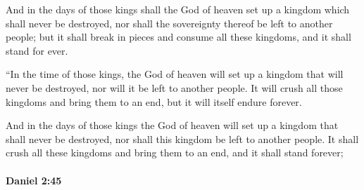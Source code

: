 			\begin{versebox}
					\item[BHS] 
					\item[LXX] 
					\item[ASV] And in the days of those kings shall the God of heaven set up a kingdom which shall never be destroyed, nor shall the sovereignty thereof be left to another people; but it shall break in pieces and consume all these kingdoms, and it shall stand for ever.
					\item[NIV] “In the time of those kings, the God of heaven will set up a kingdom that will never be destroyed, nor will it be left to another people. It will crush all those kingdoms and bring them to an end, but it will itself endure forever.
					\item[NRSV] And in the days of those kings the God of heaven will set up a kingdom that shall never be destroyed, nor shall this kingdom be left to another people. It shall crush all these kingdoms and bring them to an end, and it shall stand forever;
			\end{versebox}

		\paragraph{Daniel 2:45} %
			\label{DANIEL-2-45}


